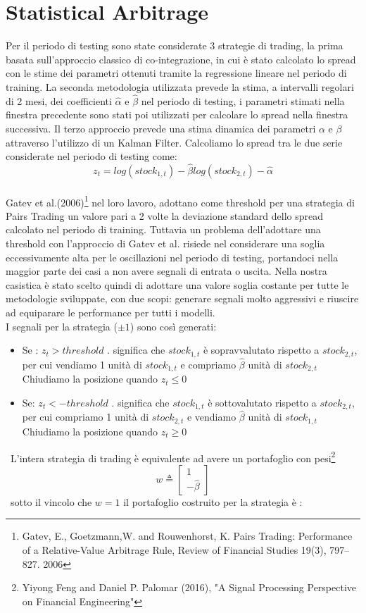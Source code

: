 \documentclass[]{article}
\begin{document}
\section{Statistical Arbitrage}
Per il periodo di testing sono state considerate 3 strategie di trading, la prima basata sull'approccio classico di co-integrazione, in cui è stato calcolato lo spread con le stime dei parametri ottenuti tramite la regressione lineare nel periodo di training.
La seconda metodologia utilizzata prevede la stima, a intervalli regolari di 2 mesi, dei coefficienti $\hat{\alpha}$ e $\hat{\beta}$ nel periodo di testing, i parametri stimati nella finestra precedente sono stati poi utilizzati per calcolare lo spread nella finestra successiva. 
Il terzo approccio prevede una stima dinamica dei parametri $\alpha$ e $\beta $ attraverso l'utilizzo di un Kalman Filter.
Calcoliamo lo spread tra le due serie considerate nel periodo di testing come:
\begin{equation} 
	z_t= log(stock_{1,t}) - \hat{\beta}log(stock_{2,t}) - \hat{\alpha} \label{spread}
\end{equation}
\\
Gatev et al.(2006)\footnote{Gatev, E., Goetzmann,W. and Rouwenhorst, K. Pairs Trading: Performance of a Relative-Value Arbitrage Rule, Review of Financial Studies 19(3), 797–827. 2006} nel loro lavoro, adottano come threshold per una strategia di Pairs Trading un valore pari a 2 volte la deviazione standard dello spread calcolato nel periodo di training. 
Tuttavia un problema dell'adottare una threshold con l'approccio di Gatev et al. risiede nel considerare una soglia eccessivamente alta per le oscillazioni nel periodo di testing, portandoci nella maggior parte dei casi a non avere segnali di entrata o uscita.
Nella nostra casistica è stato scelto quindi di adottare una valore soglia costante per tutte le metodologie sviluppate, con due scopi: generare segnali molto aggressivi e riuscire ad equiparare le performance per tutti i modelli.
\\
I segnali per la strategia ($\pm 1$) sono così generati:
\begin{itemize}
	\item Se : $z_t > threshold$ . significa che $stock_{1,t}$ è sopravvalutato rispetto a $stock_{2,t}$, per cui vendiamo 1 unità di $stock_{1,t}$ e compriamo $\hat{\beta}$ unità di $stock_{2,t}$
	Chiudiamo la posizione quando $z_t\leq 0$
	\item Se: $z_t < - threshold$ . significa che $stock_{1,t}$ è sottovalutato rispetto a $stock_{2,t}$, per cui compriamo 1 unità di $stock_{2,t}$ e vendiamo $\hat{\beta}$ unità di $stock_{1,t}$
	Chiudiamo la posizione quando $z_t\geq 0$
\end{itemize}
\
L'intera strategia di trading è equivalente ad avere un portafoglio con pesi\footnote{Yiyong Feng and Daniel P. Palomar (2016), "A Signal Processing Perspective on Financial Engineering"}
\begin{equation} 
w\triangleq 
\begin{bmatrix}
	1 \\
	-\hat{\beta}
\end{bmatrix}
\end{equation}
\
sotto il vincolo che $w=1$ il portafoglio costruito per la strategia è :
\end{document}
